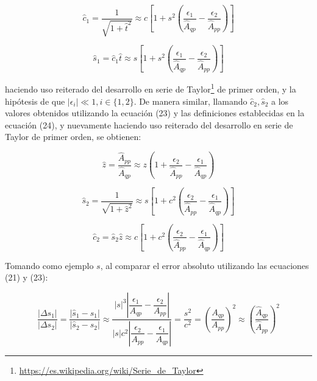 \documentclass[spanish]{article}
\newcommand\abs[1]{\left|#1\right|}
\begin{document}
            \begin{equation}
                \hat{c}_{1} = \dfrac{1}{\sqrt{1 + \hat{t}^{2}}} \approx c \left[1 + s^{2}\left( \dfrac{\epsilon_{1}}{\hat{A}_{q p}} - \dfrac{\epsilon_{2}}{\hat{A}_{p p}}\right)\right]
            \end{equation}
            
            \begin{equation}
                \hat{s}_{1} = \hat{c}_{1} \hat{t} \approx s \left[1 + s^{2}\left( \dfrac{\epsilon_{1}}{\hat{A}_{q p}} - \dfrac{\epsilon_{2}}{\hat{A}_{p p}}\right)\right]
            \end{equation}
            
            haciendo uso reiterado del desarrollo en serie de Taylor\footnote{\url{https://es.wikipedia.org/wiki/Serie_de_Taylor}} de primer orden, y la hipótesis de que $\abs{\epsilon_{i}} \ll 1, i \in \{1,2\}$. De manera similar, llamando $\hat{c}_{2}, \hat{s}_{2}$ a los valores obtenidos utilizando la ecuación (23) y las definiciones establecidas en la ecuación (24), y nuevamente haciendo uso reiterado del desarrollo en serie de Taylor de primer orden, se obtienen:
            
            
            \begin{equation}
                \hat{z} = \dfrac{\hat{A}_{p p}}{\hat{A}_{q p}} \approx z \left(1 + \dfrac{\epsilon_{2}}{\hat{A}_{p p}} - \dfrac{\epsilon_{1}}{\hat{A}_{q p}}\right)
            \end{equation}
            
            \begin{equation}
                \hat{s}_{2} = \dfrac{1}{\sqrt{1 + \hat{z}^{2}}} \approx s \left[1 + c^{2}\left( \dfrac{\epsilon_{2}}{\hat{A}_{p p}} - \dfrac{\epsilon_{1}}{\hat{A}_{q p}}\right)\right]
            \end{equation}
            
            \begin{equation}
                \hat{c}_{2} = \hat{s}_{2} \hat{z} \approx c \left[1 + c^{2}\left( \dfrac{\epsilon_{2}}{\hat{A}_{p p}} - \dfrac{\epsilon_{1}}{\hat{A}_{q p}}\right)\right]
            \end{equation}
            
            \par Tomando como ejemplo $s$, al comparar el error absoluto utilizando las ecuaciones (21) y (23):
            
            \begin{equation}
                \dfrac{\abs{\Delta s_{1}}}{\abs{\Delta s_{2}}} 
                = \dfrac{\abs{\hat{s}_{1} - s_{1}}}{\abs{\hat{s}_{2} - s_{2}}}
                \approx \dfrac{\abs{s}^{3} \abs{ \dfrac{\epsilon_{1}}{A_{q p}} - \dfrac{\epsilon_{2}}{A_{p p}}}}
                    {\abs{s} c^{2} \abs{ \dfrac{\epsilon_{2}}{A_{p p}} - \dfrac{\epsilon_{1}}{A_{q p}}}}
                = \dfrac{s^{2}}{c^{2}} = \left( \dfrac{A_{q p}}{A_{p p}} \right)^{2}
                \approx \left( \dfrac{\hat{A}_{q p}}{\hat{A}_{p p}} \right)^{2}
            \end{equation}
            
\end{document}
